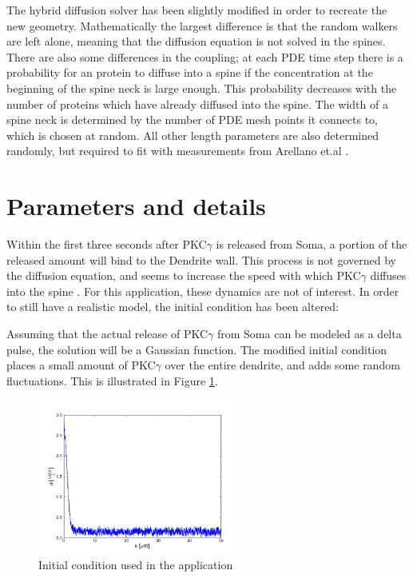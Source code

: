 The hybrid diffusion solver has been slightly modified in order to recreate the new geometry. 
Mathematically the largest difference is that the random walkers are left alone, meaning that the diffusion equation is not solved in the spines. 
There are also some differences in the coupling; at each PDE time step there is a probability for an protein to diffuse into a spine if the concentration at the beginning of the spine neck is large enough. This probability decreases with the number of proteins which have already diffused into the spine. 
The width of a spine neck is determined by the number of PDE mesh points it connects to, which is chosen at random. 
All other length parameters are also determined randomly, but required to fit with measurements from Arellano et.al \cite{arellano2007ultrastructure}. 

\section{Parameters and details}
Within the first three seconds after PKC$\gamma$ is released from Soma, a portion of the released amount will bind to the Dendrite wall. 
This process is not governed by the diffusion equation, and seems to increase the speed with which PKC$\gamma$ diffuses into the spine \cite{craske2005spines}. 
For this application, these dynamics are not of interest. In order to still have a realistic model, the initial condition has been altered: 

Assuming that the actual release of PKC$\gamma$ from Soma can be modeled as a delta pulse, the solution will be a Gaussian function. 
The modified initial condition places a small amount of PKC$\gamma$ over the entire dendrite, and adds some random fluctuations. This is illustrated in Figure \ref{initial}. 
\begin{figure}[H]
 \centering
 \includegraphics[width=0.6\textwidth]{Figures/initial_condition_application.png}
 \caption{Initial condition used in the application}
 \label{initial}
\end{figure}

